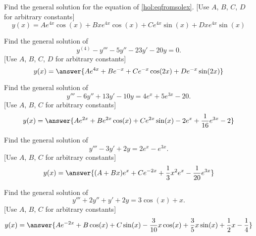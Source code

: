 \documentclass{ximera}
\begin{document}
\begin{exercise}
    Find the general solution for the equation of \ref{hol:eqfromsolex}. [Use $A$, $B$, $C$, $D$ for arbitrary constants]
    \[
        y(x) = {Ae^{4x}\cos(x) + Bxe^{4x}\cos(x) + Ce^{4x}\sin(x) + Dxe^{4x}\sin(x)}
    \]
\end{exercise}

\begin{exercise}%
    Find the general solution of
    \begin{equation*}
        y^{(4)} - y''' - 5y'' - 23y' - 20y = 0.
    \end{equation*}
    [Use $A$, $B$, $C$, $D$ for arbitrary constants]
    \[
        y(x) = \answer{Ae^{4x} + Be^{-x} + Ce^{-x}\cos(2x) + De^{-x}\sin(2x)}
    \]
\end{exercise}

\begin{exercise}
    Find the general solution of
    \begin{equation*}
        y''' - 6y'' + 13y' - 10y = 4e^x + 5e^{3x} - 20.
    \end{equation*}
    [Use $A$, $B$, $C$ for arbitrary constants]
    \[
        y(x) = \answer{A e^{2x} + Be^{2x}\cos(x) + Ce^{2x}\sin(x) - 2e^x + \frac{1}{16}e^{3x} - 2}
    \]
\end{exercise}


\begin{exercise}
    Find the general solution of
    \begin{equation*}
        y''' - 3y' + 2y = 2e^{x} - e^{3x}.
    \end{equation*}
    [Use $A$, $B$, $C$ for arbitrary constants]
    \[
        y(x) = \answer{(A + Bx)e^{x} + Ce^{-2x} + \frac{1}{3}x^2e^x - \frac{1}{20}e^{3x}}
    \]
\end{exercise}


\begin{exercise}
    Find the general solution of
    \begin{equation*}
        y''' + 2y'' + y' + 2y = 3\cos(x) + x.
    \end{equation*}
    [Use $A$, $B$, $C$ for arbitrary constants]
    \[
        y(x) = \answer{Ae^{-2x} + B\cos(x) + C\sin(x) - \frac{3}{10}x\cos(x) + \frac{3}{5}x\sin(x) + \frac{1}{2}x - \frac{1}{4}}
    \]

\end{exercise}
\end{document}
